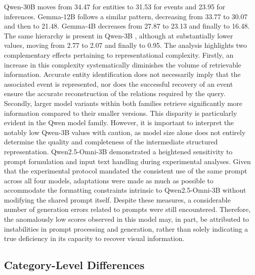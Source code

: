 Qwen-30B moves from 34.47 for entities to 31.53 for events and 23.95 for inferences. Gemma-12B follows a similar pattern, decreasing from 33.77 to 30.07 and then to 21.48. Gemma-4B    decreases from 27.87 to 23.13 and finally to 16.48. The same hierarchy is present in Qwen-3B , although at substantially lower values, moving from 2.77 to 2.07 and finally to 0.95.
The analysis highlights two complementary effects pertaining to representational complexity. Firstly, an increase in this complexity systematically diminishes the volume of retrievable information. Accurate entity identification does not necessarily imply that the associated event is represented, nor does the successful recovery of an event ensure the accurate reconstruction of the relations required by the query. Secondly, larger model variants within both families retrieve significantly more information compared to their smaller versions. This disparity is particularly evident in the Qwen model family. However, it is important to interpret the notably low Qwen-3B  values with caution, as model size alone does not entirely determine the quality and completeness of the intermediate structured representation. Qwen2.5-Omni-3B demonstrated a heightened sensitivity to prompt formulation and input text handling during experimental analyses. Given that the experimental protocol mandated the consistent use of the same prompt across all four models, adaptations were made as much as possible to accommodate the formatting constraints intrinsic to Qwen2.5-Omni-3B without modifying the shared prompt itself. Despite these measures, a considerable number of generation errors related to prompts were still encountered. Therefore, the anomalously low scores observed in this model may, in part, be attributed to instabilities in prompt processing and generation, rather than solely indicating a true deficiency in its capacity to recover visual information.
\subsection*{Category-Level Differences}


